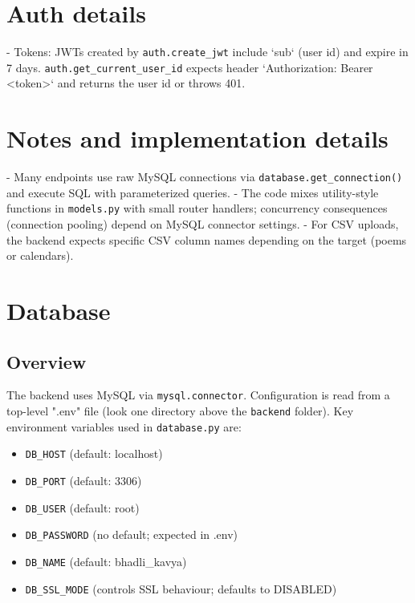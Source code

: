 \documentclass[11pt]{article}
\begin{document}
\section*{Auth details}
- Tokens: JWTs created by \texttt{auth.create\_jwt} include `sub` (user id) and expire in 7 days. \texttt{auth.get\_current\_user\_id} expects header `Authorization: Bearer <token>` and returns the user id or throws 401.

\section*{Notes and implementation details}
- Many endpoints use raw MySQL connections via \texttt{database.get\_connection()} and execute SQL with parameterized queries.
- The code mixes utility-style functions in \texttt{models.py} with small router handlers; concurrency consequences (connection pooling) depend on MySQL connector settings.
- For CSV uploads, the backend expects specific CSV column names depending on the target (poems or calendars).

\newpage

\section{Database}

\subsection*{Overview}
The backend uses MySQL via \texttt{mysql.connector}. Configuration is read from a top-level ".env" file (look one directory above the \texttt{backend} folder). Key environment variables used in \texttt{database.py} are:

\begin{itemize}
  \item \texttt{DB\_HOST} (default: localhost)
  \item \texttt{DB\_PORT} (default: 3306)
  \item \texttt{DB\_USER} (default: root)
  \item \texttt{DB\_PASSWORD} (no default; expected in .env)
  \item \texttt{DB\_NAME} (default: bhadli\_kavya)
  \item \texttt{DB\_SSL\_MODE} (controls SSL behaviour; defaults to DISABLED)
\end{itemize}
\end{document}
